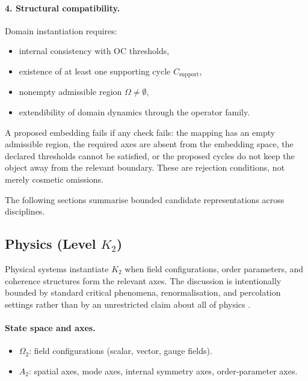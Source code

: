 \paragraph{4. Structural compatibility.}
Domain instantiation requires:
\begin{itemize}
  \item internal consistency with OC thresholds,
  \item existence of at least one supporting cycle \(C_{\mathrm{support}}\),
  \item nonempty admissible region \(\Omega\neq\emptyset\),
  \item extendibility of domain dynamics through the operator family.
\end{itemize}

A proposed embedding fails if any check fails: the mapping has an empty
admissible region, the required axes are absent from the embedding
space, the declared thresholds cannot be satisfied, or the proposed cycles do
not keep the object away from the relevant boundary. These are rejection
conditions, not merely cosmetic omissions.

The following sections summarise bounded candidate representations across
disciplines.

\subsection{Physics (Level \texorpdfstring{$K_2$}{K2})}

Physical systems instantiate \(K_2\) when field configurations, order
parameters, and coherence structures form the relevant axes.
The discussion is intentionally bounded by standard critical phenomena,
renormalisation, and percolation settings rather than by an unrestricted claim
about all of physics \parencite{goldenfeld_lectures,wilson_renormalization,stauffer_percolation}.

\paragraph{State space and axes.}
\begin{itemize}
  \item \(\Omega_{2}\): field configurations (scalar, vector, gauge fields).
  \item \(A_{2}\): spatial axes, mode axes, internal symmetry axes,
        order-parameter axes.
\end{itemize}

